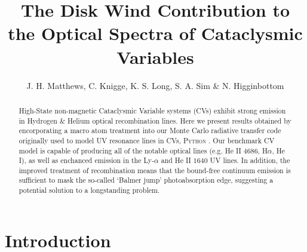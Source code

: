 \documentclass[useAMS,usenatbib, onecolumn]{mn2ejm}
\begin{document}

\renewcommand{\labelitemi}{$-$}
\def\la{Ly-$\alpha$ }
\def\py{\textsc{Python} }
\def\civ{C~\textsc{iv} }
\def\araa{ARAA}
\def\nat{Nature}
\def\apjl{ApJ Letters}
\def\aapr{AAPR}
\def\ssr{SSR}
\def\apj{ApJ}
\def\pasp{PASP}
\def\aap{A\&A}
\def\mnras{MNRAS}
\def\aj{AJ}
\def\rmxaa{RMXAA}

%
%


\title{The Disk Wind Contribution to the Optical Spectra of Cataclysmic Variables}
\author{J. H.
  Matthews, C. Knigge, K. S. Long, S. A. Sim \& N. Higginbottom}


%
%


\maketitle


\begin{abstract}
High-State non-magnetic Cataclysmic Variable systems (CVs) exhibit strong emission in Hydrogen \& Helium 
optical recombination lines. Here we present results obtained by encorporating a macro atom treatment into
our Monte Carlo radiative transfer code originally used
to model UV resonance lines in CVs, \py. Our benchmark CV model is capable of producing
all of the notable optical lines (e.g. He II 4686, H${\alpha}$, He I), as well as
enchanced emission in the Ly-$\alpha$ and He II $1640$ UV lines.
In addition, the improved treatment of recombination means that the bound-free continuum
emission is sufficient to mask the so-called `Balmer jump' photoabsorption edge, 
suggesting a potential solution to a longstanding problem. 
\end{abstract}

%
%

\section{Introduction} 
\end{document}
